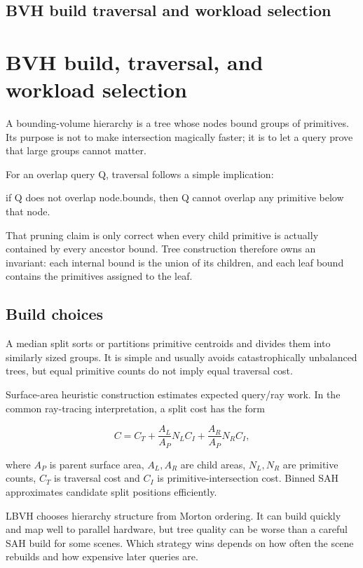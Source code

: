 \hypertarget{appendix-5653a7aea6bb}{}
\section*{BVH build traversal and workload selection}
\chapter{BVH build, traversal, and workload selection}\label{appendix-5653a7aea6bb-bvh-build-traversal-and-workload-selection}

A bounding-volume hierarchy is a tree whose nodes bound groups of primitives. Its purpose is not to make intersection magically faster; it is to let a query prove that large groups cannot matter.

For an overlap query Q, traversal follows a simple implication:

if Q does not overlap node.bounds, then Q cannot overlap any primitive below that node.

That pruning claim is only correct when every child primitive is actually contained by every ancestor bound. Tree construction therefore owns an invariant: each internal bound is the union of its children, and each leaf bound contains the primitives assigned to the leaf.

\section{Build choices}\label{appendix-5653a7aea6bb-build-choices}

A median split sorts or partitions primitive centroids and divides them into similarly sized groups. It is simple and usually avoids catastrophically unbalanced trees, but equal primitive counts do not imply equal traversal cost.

Surface-area heuristic construction estimates expected query/ray work. In the common ray-tracing interpretation, a split cost has the form

\[
C = C_T +
\frac{A_L}{A_P}N_L C_I +
\frac{A_R}{A_P}N_R C_I,
\]

where \(A_P\) is parent surface area, \(A_L,A_R\) are child areas, \(N_L,N_R\) are primitive counts, \(C_T\) is traversal cost and \(C_I\) is primitive-intersection cost. Binned SAH approximates candidate split positions efficiently.

LBVH chooses hierarchy structure from Morton ordering. It can build quickly and map well to parallel hardware, but tree quality can be worse than a careful SAH build for some scenes. Which strategy wins depends on how often the scene rebuilds and how expensive later queries are.

